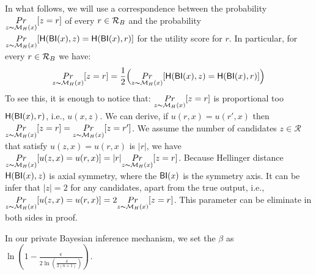 \documentclass[sigconf, anonymous]{acmart}
\begin{document}
In what follows, we will use a correspondence between the probability
 $\underset{z \thicksim \mathcal{M}_H(x)}{Pr}[z = r]$ of every
 $r\in\mathcal{R}_{B}$ and the probability 
 $\underset{z \thicksim \mathcal{M}_H(x)}{Pr}[\mathsf{H}(\mathsf{BI}(x),z) =
 \mathsf{H}(\mathsf{BI}(x),r)]$ for the utility score for $r$. In particular, for every
 $r\in\mathcal{R}_{B}$ we have:
$$
\underset{z \thicksim \mathcal{M}_H(x)}{Pr}[z = r]=
\frac{1}{2}\Big (\underset{z \thicksim \mathcal{M}_H(x)}{Pr}[\mathsf{H}(\mathsf{BI}(x),z) =
 \mathsf{H}(\mathsf{BI}(x),r)]\Big )
$$
To see this, it is enough to notice that: $\underset{z \thicksim \mathcal{M}_H(x)}{Pr}[z = r]$ is proportional too $\mathsf{H}(\mathsf{BI}(x),r)$, i.e., $u(x,z)$. We can derive, if $u(r,x) = u(r',x)$ then $\underset{z \thicksim \mathcal{M}_H(x)}{Pr}[z = r] = \underset{z \thicksim \mathcal{M}_H(x)}{Pr}[z = r']$. We assume the number of candidates $z \in \mathcal{R}$ that satisfy $u(z,x) = u(r,x)$ is $|r|$, we have  $\underset{z \thicksim \mathcal{M}_H(x)}{Pr}[u(z,x) = u(r,x)] = |r| \underset{z \thicksim \mathcal{M}_H(x)}{Pr}[z = r]$. Because Hellinger distance  $\mathsf{H}(\mathsf{BI}(x),z)$ is axial symmetry, where the $\mathsf{BI}(x)$ is the symmetry axis. It can be infer that $|z| = 2$ for any candidates, apart from the true output, i.e., $\underset{z \thicksim \mathcal{M}_H(x)}{Pr}[u(z,x) = u(r,x)] = 2 \underset{z \thicksim \mathcal{M}_H(x)}{Pr}[z = r]$. This parameter can be eliminate in both sides in proof.

In our private Bayesian inference mechanism, we set the $\beta$ as $\ln(1 - \frac{\epsilon}{2 \ln (\frac{\delta}{2 (n + 1)})})$. 






\end{document}
